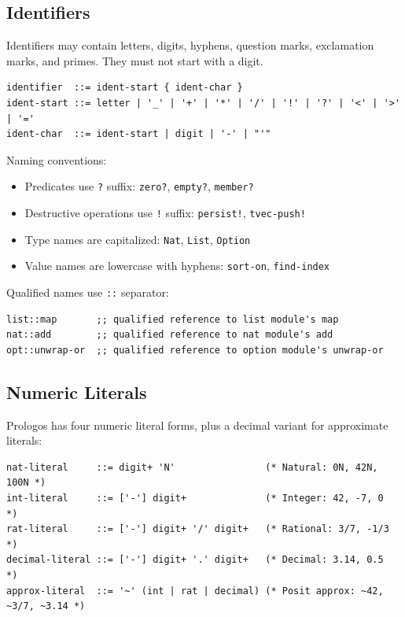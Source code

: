 \documentclass[11pt]{article}
\begin{document}
\subsection{Identifiers}
\label{sec:org425539b}

Identifiers may contain letters, digits, hyphens, question marks, exclamation
marks, and primes. They must not start with a digit.

\begin{verbatim}
identifier  ::= ident-start { ident-char }
ident-start ::= letter | '_' | '+' | '*' | '/' | '!' | '?' | '<' | '>' | '='
ident-char  ::= ident-start | digit | '-' | "'"
\end{verbatim}

Naming conventions:
\begin{itemize}
\item Predicates use \texttt{?} suffix: \texttt{zero?}, \texttt{empty?}, \texttt{member?}
\item Destructive operations use \texttt{!} suffix: \texttt{persist!}, \texttt{tvec-push!}
\item Type names are capitalized: \texttt{Nat}, \texttt{List}, \texttt{Option}
\item Value names are lowercase with hyphens: \texttt{sort-on}, \texttt{find-index}
\end{itemize}

Qualified names use \texttt{::} separator:

\begin{verbatim}
list::map       ;; qualified reference to list module's map
nat::add        ;; qualified reference to nat module's add
opt::unwrap-or  ;; qualified reference to option module's unwrap-or
\end{verbatim}
\subsection{Numeric Literals}
\label{sec:org9092880}

Prologos has four numeric literal forms, plus a decimal variant for approximate literals:

\begin{verbatim}
nat-literal     ::= digit+ 'N'                (* Natural: 0N, 42N, 100N *)
int-literal     ::= ['-'] digit+              (* Integer: 42, -7, 0     *)
rat-literal     ::= ['-'] digit+ '/' digit+   (* Rational: 3/7, -1/3   *)
decimal-literal ::= ['-'] digit+ '.' digit+   (* Decimal: 3.14, 0.5    *)
approx-literal  ::= '~' (int | rat | decimal) (* Posit approx: ~42, ~3/7, ~3.14 *)
\end{verbatim}
\end{document}
